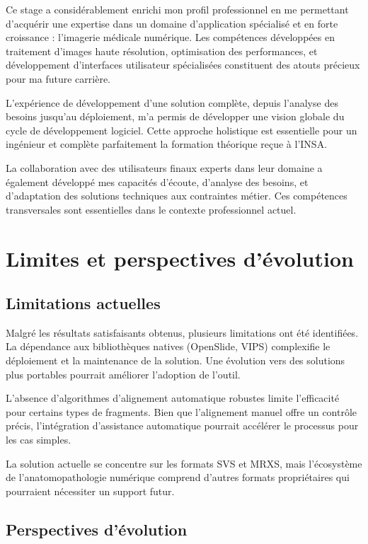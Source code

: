 \documentclass[12pt,a4paper]{report}
\begin{document}
Ce stage a considérablement enrichi mon profil professionnel en me permettant d'acquérir une expertise dans un domaine d'application spécialisé et en forte croissance : l'imagerie médicale numérique. Les compétences développées en traitement d'images haute résolution, optimisation des performances, et développement d'interfaces utilisateur spécialisées constituent des atouts précieux pour ma future carrière.

L'expérience de développement d'une solution complète, depuis l'analyse des besoins jusqu'au déploiement, m'a permis de développer une vision globale du cycle de développement logiciel. Cette approche holistique est essentielle pour un ingénieur et complète parfaitement la formation théorique reçue à l'INSA.

La collaboration avec des utilisateurs finaux experts dans leur domaine a également développé mes capacités d'écoute, d'analyse des besoins, et d'adaptation des solutions techniques aux contraintes métier. Ces compétences transversales sont essentielles dans le contexte professionnel actuel.

\section{Limites et perspectives d'évolution}

\subsection{Limitations actuelles}

Malgré les résultats satisfaisants obtenus, plusieurs limitations ont été identifiées. La dépendance aux bibliothèques natives (OpenSlide, VIPS) complexifie le déploiement et la maintenance de la solution. Une évolution vers des solutions plus portables pourrait améliorer l'adoption de l'outil.

L'absence d'algorithmes d'alignement automatique robustes limite l'efficacité pour certains types de fragments. Bien que l'alignement manuel offre un contrôle précis, l'intégration d'assistance automatique pourrait accélérer le processus pour les cas simples.

La solution actuelle se concentre sur les formats SVS et MRXS, mais l'écosystème de l'anatomopathologie numérique comprend d'autres formats propriétaires qui pourraient nécessiter un support futur.

\subsection{Perspectives d'évolution}
\end{document}

